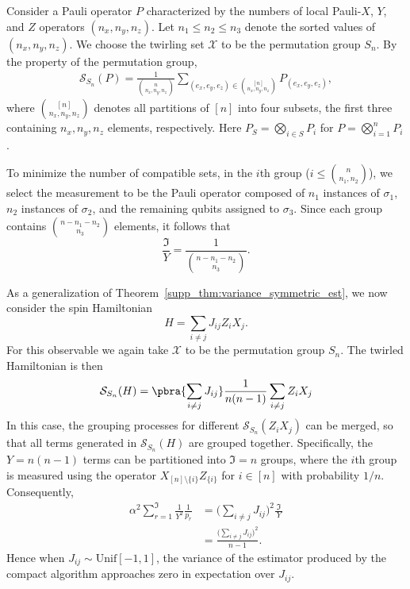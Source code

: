 \documentclass[prl,aps,notitlepage,superscriptaddress,showpacs,nofootinbib]{revtex4-2}
\begin{document}
Consider a Pauli operator $P$ characterized by the numbers of local Pauli-$X$, $Y$, and $Z$ operators $(n_x,n_y,n_z)$. Let $n_1 \leq n_2 \leq n_3$ denote the sorted values of $(n_x,n_y,n_z)$. We choose the twirling set $\mathcal{X}$ to be the permutation group $S_n$. By the property of the permutation group,  
\begin{align}
    \mathcal{S}_{S_n}(P) 
    = \frac{1}{{n \choose n_x,n_y,n_z}}
      \sum_{(e_x,e_y,e_z) \in {[n]\choose n_x,n_y,n_z}} 
      P_{(e_x,e_y,e_z)},
\end{align}
where ${[n]\choose n_x,n_y,n_z}$ denotes all partitions of $[n]$ into four subsets, the first three containing $n_x,n_y,n_z$ elements, respectively. Here $P_S = \bigotimes_{i\in S} P_i$ for $P = \bigotimes_{i=1}^n P_i$.  

To minimize the number of compatible sets, in the $i$th group ($i \leq {n \choose n_1,n_2}$), we select the measurement to be the Pauli operator composed of $n_1$ instances of $\sigma_1$, $n_2$ instances of $\sigma_2$, and the remaining qubits assigned to $\sigma_3$. Since each group contains ${n-n_1-n_2 \choose n_3}$ elements, it follows that  
\[
    \frac{\Im}{Y} = \frac{1}{{n-n_1-n_2 \choose n_3}} .
\]


As a generalization of Theorem~\ref{supp_thm:variance_symmetric_est}, we now consider the spin Hamiltonian  
\begin{equation}
    H = \sum_{i \neq j} J_{ij} Z_i X_j .
\end{equation}
For this observable we again take $\mathcal{X}$ to be the permutation group $S_n$. The twirled Hamiltonian is then  
\begin{align}
    \mathcal{S}_{S_n}(H) 
    = \pbra{\sum_{i\neq j} J_{ij}} \frac{1}{n(n-1)} \sum_{i \neq j} Z_i X_j
\end{align}
In this case, the grouping processes for different $\mathcal{S}_{S_n}(Z_i X_j)$ can be merged, so that all terms generated in $\mathcal{S}_{S_n}(H)$ are grouped together. Specifically, the $Y=n(n-1)$ terms can be partitioned into $\Im = n$ groups, where the $i$th group is measured using the operator $X_{[n]\setminus\{i\}} Z_{\{i\}}$ for $i \in [n]$ with probability $1/n$. Consequently,  
\begin{align}
        \alpha^2\sum_{r=1}^{\Im}\frac{1}{Y^2} \frac{1}{p_r}
    &= \bigl(\sum_{i \neq j} J_{ij}\bigr)^2 \frac{\Im}{\,Y\,}\\
    &=  \frac{\bigl(\sum_{i \neq j} J_{ij}\bigr)^2}{\,n-1\,}.
\end{align}
Hence when $J_{ij}\sim \mathrm{Unif}[-1,1]$, the variance of the estimator produced by the compact algorithm approaches zero in expectation over  $J_{ij}$.
\end{document}
